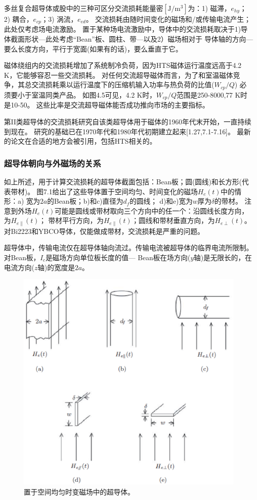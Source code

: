 多丝复合超导体或股中的三种可区分交流损耗能量密$[\mathrm{J/m^3}]$为：1) 磁滞，$e_{hy}$；
2) 耦合，$e_{cp}$；3) 涡流，$e_{ed}$。
交流损耗由随时间变化的磁场和/或传输电流产生；此处仅考虑场电流激励。
置于某种场电流激励中，导体中的交流损耗取决于1)导体截面形状---此处考虑“Bean”板、圆柱、带---以及2）磁场相对于
导体轴的方向---要么长度方向，平行于宽面(如果有的话)，要么垂直于它。

磁体绕组内的交流损耗增加了系统制冷负荷，因为HTS磁体运行温度远高于4.2 K，它能够容忍一些交流损耗。
对任何交流超导磁体而言，为了和室温磁体竞争，其总交流损耗乘以运行温度下的压缩机输入功率与热负荷的比值($W_{cp}/Q$)
必须要小于室温同类产品。
如图4.5可见，4.2 K时，$W_{cp}/Q$范围是250-8000,77 K时是10-50。
这些比率是交流超导磁体能否成功推向市场的主要指标。

第II类超导体的交流损耗研究自该类超导体用于磁体的1960年代末开始，一直持续到现在。
研究的基础已在1970年代和1980年代初期建立起来[1.27,7.1-7.16]。
最新的论文在合适的地方会被引用，包括HTS相关的。

\subsubsection*{超导体朝向与外磁场的关系}
如上所述，用于计算交流损耗的超导体截面包括：Bean板；圆(圆线)和长方形(代表带材)。
图7.1给出了这些导体置于空间均匀、时间变化的磁场$H_e(t)$中的情形：a) 宽为$2a$的Bean板；b)和c)直径为$d_f$的圆线；
d)和e)宽为$w$厚为$\delta$的带材。
注意到外场$H_e(t)$可能是圆线或带材取向三个方向中的任一个：沿圆线长度方向，为$H_{e\parallel}(t)$；
带材平行方向，为$H_{e\parallel}(t)$；圆线和带材垂直方向，为$H_{e\perp}(t)$。
对Bi2223和YBCO导体，仅能做成带材，交流损耗是严重的问题。

超导体中，传输电流仅在超导体轴向流过。传输电流被超导体的临界电流所限制。对Bean板，$I_c$是磁场方向单位板长度的值---
Bean板在场方向($y$轴)是无限长的，在电流方向($z$轴)的宽度是$2a$。
\begin{figure}[htbp]
	\centering
	\includegraphics[scale=0.6]{chpt7/figs/fig7.1.eps}
	\caption{置于空间均匀时变磁场中的超导体。}
\end{figure}

